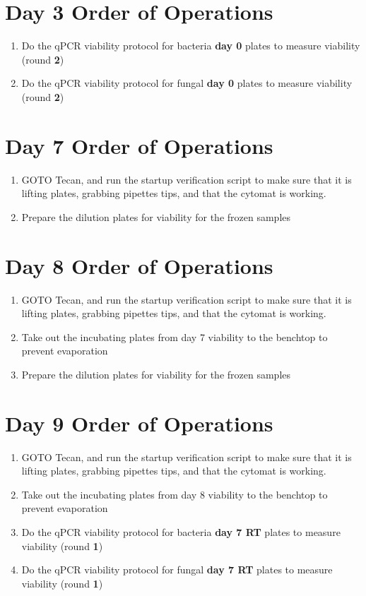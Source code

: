 \documentclass{article}
\begin{document}
\section*{Day 3 Order of Operations} \label{day1instructions}
\begin{enumerate}
    \item Do the qPCR viability protocol for bacteria \textbf{day 0} plates to measure viability (round \textbf{2})
    \item Do the qPCR viability protocol for fungal \textbf{day 0} plates to measure viability (round \textbf{2})
\end{enumerate}

\section*{Day 7 Order of Operations} \label{day7instructions}
\begin{enumerate}
    \item GOTO Tecan, and run the startup verification script to make sure that it is lifting plates, grabbing pipettes tips, and that the cytomat is working. 
    \item Prepare the dilution plates for viability for the frozen samples
\end{enumerate}

\section*{Day 8 Order of Operations} \label{day8instructions}
\begin{enumerate}
    \item GOTO Tecan, and run the startup verification script to make sure that it is lifting plates, grabbing pipettes tips, and that the cytomat is working. 
    \item Take out the incubating plates from day 7 viability to the benchtop to prevent evaporation
    \item Prepare the dilution plates for viability for the frozen samples
\end{enumerate}

\section*{Day 9 Order of Operations} \label{day8instructions}
\begin{enumerate}
    \item GOTO Tecan, and run the startup verification script to make sure that it is lifting plates, grabbing pipettes tips, and that the cytomat is working.
    \item Take out the incubating plates from day 8 viability to the benchtop to prevent evaporation
    \item Do the qPCR viability protocol for bacteria \textbf{day 7 RT} plates to measure viability (round \textbf{1})
    \item Do the qPCR viability protocol for fungal \textbf{day 7 RT} plates to measure viability (round \textbf{1})
\end{enumerate}
\end{document}
